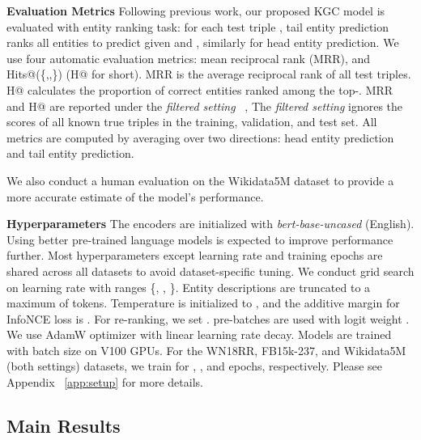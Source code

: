 \documentclass[11pt]{article}
\begin{document}
\noindent
\textbf{Evaluation Metrics }
Following previous work,
our proposed KGC model is evaluated with entity ranking task:
for each test triple ,
tail entity prediction ranks all entities to predict  given  and ,
similarly for head entity prediction.
We use four automatic evaluation metrics:
mean reciprocal rank (MRR),
and Hits@(\{,,\}) (H@ for short).
MRR is the average reciprocal rank of all test triples.
H@ calculates the proportion of correct entities ranked among the top-.
MRR and H@ are reported under the \emph{filtered setting} ~\citep{bordes2013translating},
The \emph{filtered setting} ignores the scores of all known true triples
in the training, validation, and test set.
All metrics are computed by averaging over two directions:
head entity prediction and tail entity prediction.

We also conduct a human evaluation on the Wikidata5M dataset
to provide a more accurate estimate of the model's performance.
\newline

\noindent
\textbf{Hyperparameters }
The encoders are initialized with \emph{bert-base-uncased} (English).
Using better pre-trained language models is expected to improve performance further.
Most hyperparameters except learning rate and training epochs
are shared across all datasets
to avoid dataset-specific tuning.
We conduct grid search on learning rate with ranges \{, , \}.
Entity descriptions are truncated to a maximum of  tokens.
Temperature  is initialized to ,
and the additive margin for InfoNCE loss is .
For re-ranking,
we set .
 pre-batches are used with logit weight .
We use AdamW optimizer with linear learning rate decay.
Models are trained with batch size  on  V100 GPUs.
For the WN18RR, FB15k-237, and Wikidata5M (both settings) datasets,
we train for , , and  epochs, respectively.
Please see Appendix ~\ref{app:setup} for more details.

\subsection{Main Results}
\end{document}
